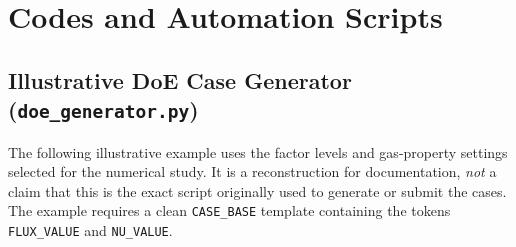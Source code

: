 \chapter{Codes and Automation Scripts}
\label{ch:appendix_codes}

\section{Illustrative DoE Case Generator (\texttt{doe\_generator.py})}
\label{sec:app_doe_gen}
The following illustrative example uses the factor levels and gas-property settings selected for the numerical study. It is a reconstruction for documentation, \emph{not} a claim that this is the exact script originally used to generate or submit the cases. The example requires a clean \texttt{CASE\_BASE} template containing the tokens \texttt{FLUX\_VALUE} and \texttt{NU\_VALUE}.

